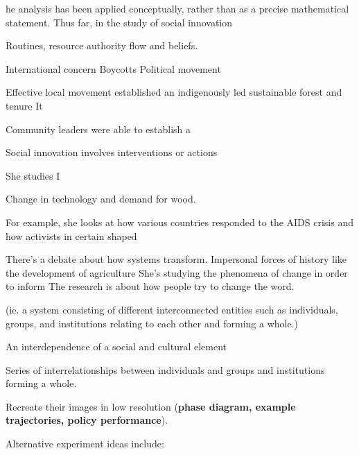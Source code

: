 he analysis has been applied conceptually, rather than as a precise mathematical statement. Thus far, in the study of social innovation 

Routines, resource authority flow and beliefs. 

International concern
Boycotts 
Political movement

Effective local movement established an indigenously led sustainable forest and tenure
It 



Community leaders were able to establish a 




Social innovation involves interventions or actions 




She studies I

Change in technology and demand for wood. 

For example, she looks at how various countries responded to the AIDS crisis and how activists in certain shaped 

There's a debate about how systems transform. 
Impersonal forces of history like the development of agriculture
She's studying the phenomena of change in order to inform 
The research is about how people try to change the word. 

(ie. a system consisting of different interconnected entities such as  individuals, groups, and institutions relating to each other and forming a whole.)

An interdependence of a social and cultural element 

Series of interrelationships between individuals and groups and institutions forming a whole. 







Recreate their images in low resolution (\textbf{phase diagram, example trajectories, policy performance}).

Alternative experiment ideas include:

